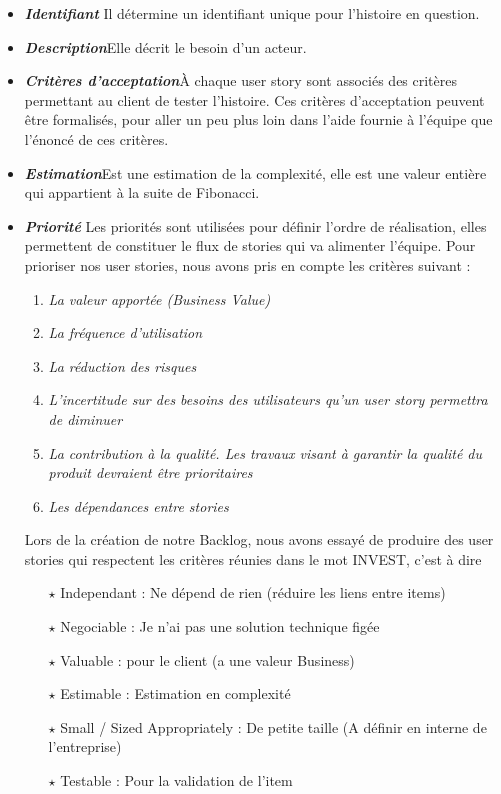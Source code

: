 \begin{itemize}[label=$\square$,leftmargin=* ,parsep=0cm,itemsep=0cm,topsep=0cm]
    \item \textit{\textbf{Identifiant}} Il détermine un identifiant unique pour l’histoire en question.\\
 	
 	\item \textit{\textbf{Description}}Elle décrit le besoin d’un acteur.\\
 	
 	\item \textit{\textbf{Critères d’acceptation}}À chaque user story sont associés des critères permettant au client
 	de tester l’histoire. Ces critères d’acceptation peuvent être formalisés, pour aller un peu plus
 	loin dans l’aide fournie à l’équipe que l’énoncé de ces critères.\\
 
 	\item \textit{\textbf{Estimation}}Est une estimation de la complexité, elle est une valeur entière qui appartient à la suite de Fibonacci.
 	 
 	
 	\item \textit{\textbf{Priorité}}  Les priorités sont utilisées pour définir l’ordre de réalisation, elles permettent de
 	constituer le flux de stories qui va alimenter l’équipe. Pour prioriser nos user stories, nous
 	avons pris en compte les critères suivant :
 	\begin{enumerate}
 		\item \textit{La valeur apportée (Business Value)}
 		\item \textit{La fréquence d’utilisation}
 		\item \textit{La réduction des risques}
 		\item \textit{L’incertitude sur des besoins des utilisateurs qu’un user story permettra de diminuer}
 		\item \textit{La contribution à la qualité. Les travaux visant à garantir la qualité du produit devraient être prioritaires}
 		\item \textit{Les dépendances entre stories}
 	\end{enumerate}
 	
Lors de la création de notre Backlog, nous avons essayé de produire des user stories qui respectent
les critères réunies dans le mot INVEST, c’est à dire
	\begin{itemize}	
\item[$\star$] Independant : Ne dépend de rien (réduire les liens entre items)
\item[$\star$] Negociable : Je n’ai pas une solution technique figée
\item[$\star$] Valuable : pour le client (a une valeur Business)
\item[$\star$] Estimable : Estimation en complexité
\item[$\star$] Small / Sized Appropriately : De petite taille (A définir en interne de l’entreprise)
\item[$\star$] Testable : Pour la validation de l’item
\end{itemize}
\end{itemize}
 \bigskip
 

